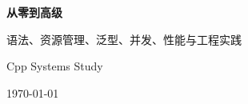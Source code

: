 \begin{titlepage}
  \centering
  \vspace*{2.6cm}
  {\Huge\bfseries\color{BookNavy} \cpp 从零到高级\par}
  \vspace{0.8cm}
  {\Large\color{BookAccent} 语法、资源管理、泛型、并发、性能与工程实践\par}
  \vfill
  {\large Cpp Systems Study\par}
  \vspace{0.4cm}
  {\large \today\par}
\end{titlepage}

